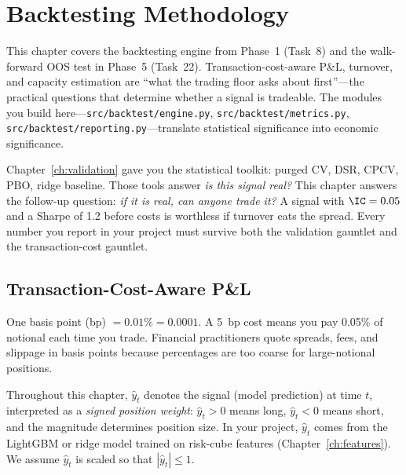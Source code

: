 \chapter{Backtesting Methodology}
\label{ch:backtesting}

\begin{projectconnection}
This chapter covers the backtesting engine from Phase~1 (Task~8) and the walk-forward OOS test in Phase~5 (Task~22).  Transaction-cost-aware P\&L, turnover, and capacity estimation are ``what the trading floor asks about first''---the practical questions that determine whether a signal is tradeable.  The modules you build here---\texttt{src/backtest/engine.py}, \texttt{src/backtest/metrics.py}, \texttt{src/backtest/reporting.py}---translate statistical significance into economic significance.
\end{projectconnection}

Chapter~\ref{ch:validation} gave you the statistical toolkit: purged CV, DSR, CPCV, PBO, ridge baseline.  Those tools answer \emph{is this signal real?}  This chapter answers the follow-up question: \emph{if it is real, can anyone trade it?}  A signal with $\IC = 0.05$ and a Sharpe of 1.2 before costs is worthless if turnover eats the spread.  Every number you report in your project must survive both the validation gauntlet and the transaction-cost gauntlet.


\section{Transaction-Cost-Aware P\&L}
\label{sec:tc-pnl}

\begin{prereq}
One basis point (bp) $= 0.01\% = 0.0001$.  A 5~bp cost means you pay 0.05\% of notional each time you trade.  Financial practitioners quote spreads, fees, and slippage in basis points because percentages are too coarse for large-notional positions.
\end{prereq}

\begin{prereq}
Throughout this chapter, $\hat{y}_t$ denotes the signal (model prediction) at time $t$, interpreted as a \emph{signed position weight}: $\hat{y}_t > 0$ means long, $\hat{y}_t < 0$ means short, and the magnitude determines position size.  In your project, $\hat{y}_t$ comes from the LightGBM or ridge model trained on risk-cube features (Chapter~\ref{ch:features}).  We assume $\hat{y}_t$ is scaled so that $|\hat{y}_t| \leq 1$.
\end{prereq}

